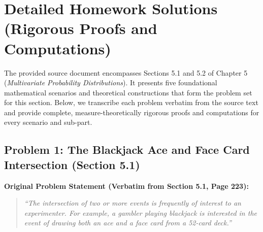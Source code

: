 \documentclass[11pt, letterpaper]{article}
\theoremstyle{definition}
\theoremstyle{remark}
\begin{document}
\newpage
\section{Detailed Homework Solutions (Rigorous Proofs and Computations)}

The provided source document encompasses Sections 5.1 and 5.2 of Chapter 5 (\emph{Multivariate Probability Distributions}). It presents five foundational mathematical scenarios and theoretical constructions that form the problem set for this section. Below, we transcribe each problem verbatim from the source text and provide complete, measure-theoretically rigorous proofs and computations for every scenario and sub-part.

\subsection{Problem 1: The Blackjack Ace and Face Card Intersection (Section 5.1)}

\textbf{Original Problem Statement (Verbatim from Section 5.1, Page 223):}
\begin{quote}
\emph{``The intersection of two or more events is frequently of interest to an experimenter. For example, a gambler playing blackjack is interested in the event of drawing both an ace and a face card from a 52-card deck.''}
\end{quote}
\end{document}
